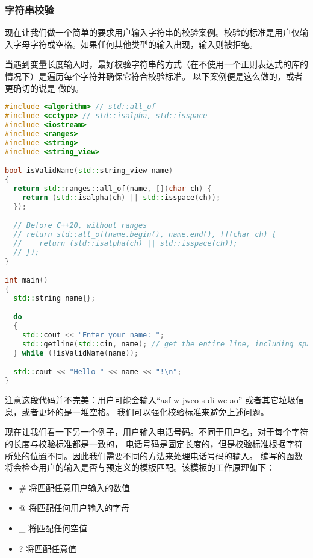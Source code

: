 \documentclass[../../LearnCpp.tex]{subfiles}
\begin{document}
\subsubsection*{字符串校验}

现在让我们做一个简单的要求用户输入字符串的校验案例。校验的标准是用户仅输入字母字符或空格。如果任何其他类型的输入出现，输入则被拒绝。

当遇到变量长度输入时，最好校验字符串的方式（在不使用一个正则表达式的库的情况下）是遍历每个字符并确保它符合校验标准。
以下案例便是这么做的，或者更确切的说是  做的。

\begin{lstlisting}[language=C++]
#include <algorithm> // std::all_of
#include <cctype> // std::isalpha, std::isspace
#include <iostream>
#include <ranges>
#include <string>
#include <string_view>

bool isValidName(std::string_view name)
{
  return std::ranges::all_of(name, [](char ch) {
    return (std::isalpha(ch) || std::isspace(ch));
  });

  // Before C++20, without ranges
  // return std::all_of(name.begin(), name.end(), [](char ch) {
  //    return (std::isalpha(ch) || std::isspace(ch));
  // });
}

int main()
{
  std::string name{};

  do
  {
    std::cout << "Enter your name: ";
    std::getline(std::cin, name); // get the entire line, including spaces
  } while (!isValidName(name));

  std::cout << "Hello " << name << "!\n";
}
\end{lstlisting}

注意这段代码并不完美：用户可能会输入“asf w jweo s di we ao” 或者其它垃圾信息，或者更坏的是一堆空格。
我们可以强化校验标准来避免上述问题。

现在让我们看一下另一个例子，用户输入电话号码。不同于用户名，对于每个字符的长度与校验标准都是一致的，
电话号码是固定长度的，但是校验标准根据字符所处的位置不同。因此我们需要不同的方法来处理电话号码的输入。
编写的函数将会检查用户的输入是否与预定义的模板匹配。该模板的工作原理如下：

\begin{itemize}
  \item \# 将匹配任意用户输入的数值
  \item @ 将匹配任何用户输入的字母
  \item \_ 将匹配任何空值
  \item ? 将匹配任意值
\end{itemize}
\end{document}
